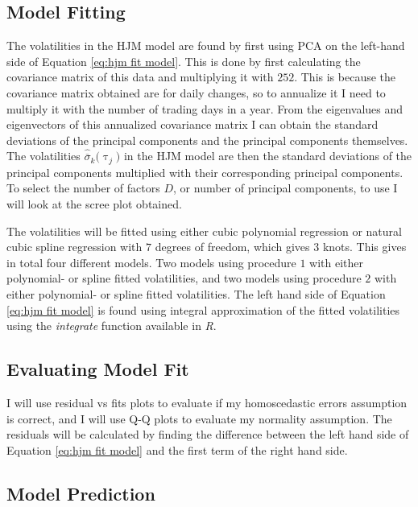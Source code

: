 \subsection{Model Fitting}

\noindent The volatilities in the HJM model are found by first using PCA on the left-hand side of Equation \eqref{eq:hjm fit model}. This is done by first calculating the covariance matrix of this data and multiplying it with $252$. This is because the covariance matrix obtained are for daily changes, so to annualize it I need to multiply it with the number of trading days in a year. From the eigenvalues and eigenvectors of this annualized covariance matrix I can obtain the standard deviations of the principal components and the principal components themselves. The volatilities $\hat{\overline{\sigma}}_k \bigl( \uptau_j \bigr)$ in the HJM model are then the standard deviations of the principal components multiplied with their corresponding principal components. To select the number of factors $D$, or number of principal components, to use I will look at the scree plot obtained.



The volatilities will be fitted using either cubic polynomial regression or natural cubic spline regression with $7$ degrees of freedom, which gives $3$ knots. This gives in total four different models. Two models using procedure $1$ with either polynomial- or spline fitted volatilities, and two models using procedure $2$ with either polynomial- or spline fitted volatilities. The left hand side of Equation \eqref{eq:hjm fit model} is found using integral approximation of the fitted volatilities using the \textit{integrate} function available in \textit{R}.



\subsection{Evaluating Model Fit}

\noindent I will use residual vs fits plots to evaluate if my homoscedastic errors assumption is correct, and I will use Q-Q plots to evaluate my normality assumption. The residuals will be calculated by finding the difference between the left hand side of Equation \eqref{eq:hjm fit model} and the first term of the right hand side.



\subsection{Model Prediction}

